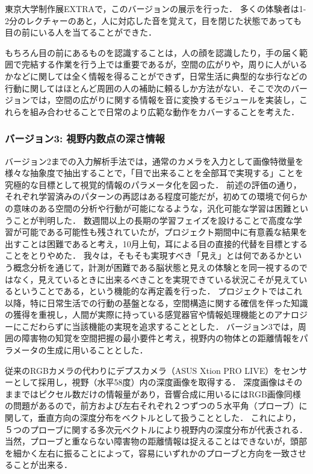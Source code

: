 東京大学制作展EXTRAで，このバージョンの展示を行った．
多くの体験者は1-2分のレクチャーのあと，人に対応した音を覚えて，目を閉じた状態であっても目の前にいる人を当てることができた．

もちろん目の前にあるものを認識することは，人の顔を認識したり，手の届く範囲で完結する作業を行う上では重要であるが，空間の広がりや，周りに人がいるかなどに関しては全く情報を得ることができず，日常生活に典型的な歩行などの行動に関してはほとんど周囲の人の補助に頼るしか方法がない．そこで次のバージョンでは，空間の広がりに関する情報を音に変換するモジュールを実装し，これらを組み合わせることで日常のより広範な動作をカバーすることを考えた．

\subsubsection{バージョン3: 視野内数点の深さ情報}

バージョン2までの入力解析手法では，通常のカメラを入力として画像特徴量を様々な抽象度で抽出することで，「目で出来ることを全部耳で実現する」ことを究極的な目標として視覚的情報のパラメータ化を図った．
前述の評価の通り，それぞれ学習済みのパターンの再認はある程度可能だが，初めての環境で何らかの意味のある空間の分析や行動が可能になるような，汎化可能な学習は困難ということが判明した．
数週間以上の長期の学習フェイズを設けることで高度な学習が可能である可能性も残されていたが，プロジェクト期間中に有意義な結果を出すことは困難であると考え，10月上旬，耳による目の直接的代替を目標とすることをとりやめた．
我々は，そもそも実現すべき「見え」とは何であるかという概念分析を通じて，計測が困難である脳状態と見えの体験とを同一視するのではなく，見えているときに出来るべきことを実現できている状況こそが見えているということである，という機能的な再定義を行った．
プロジェクトではこれ以降，特に日常生活での行動の基盤となる，空間構造に関する確信を伴った知識の獲得を重視し，人間が実際に持っている感覚器官や情報処理機能とのアナロジーにこだわらずに当該機能の実現を追求することとした．
バージョン3では，周囲の障害物の知覚を空間把握の最小要件と考え，視野内の物体との距離情報をパラメータの生成に用いることとした．

従来のRGBカメラの代わりにデプスカメラ（ASUS Xtion PRO LIVE）をセンサーとして採用し，視野（水平58度）内の深度画像を取得する．
深度画像はそのままではピクセル数だけの情報量があり，音響合成に用いるにはRGB画像同様の問題があるので，前方および左右それぞれ２つずつの５水平角（プローブ）に関して，垂直方向の深度分布をベクトルとして扱うこととした．
これにより，５つのプローブに関する多次元ベクトルにより視野内の深度分布が代表される．
当然，プローブと重ならない障害物の距離情報は捉えることはできないが，頭部を細かく左右に振ることによって，容易にいずれかのプローブと方向を一致させることが出来る．

